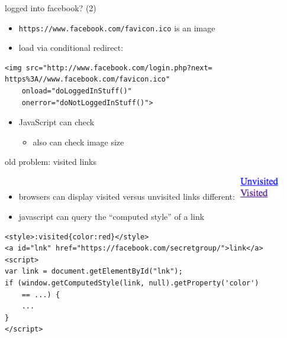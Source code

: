 \begin{frame}[fragile,label=inFB2]{logged into facebook? (2)}
    \begin{itemize}
        \item \texttt{https://www.facebook.com/favicon.ico} is an image
        \item load via conditional redirect:
    \end{itemize}
    \begin{verbatim}
<img src="http://www.facebook.com/login.php?next= https%3A//www.facebook.com/favicon.ico"
    onload="doLoggedInStuff()"
    onerror="doNotLoggedInStuff()">
\end{verbatim}
    \begin{itemize}
        \item JavaScript can check 
            \begin{itemize}
            \item also can check image size
            \end{itemize}
    \end{itemize}
\end{frame}


\begin{frame}[fragile,label=visitedLinks]{old problem: visited links}
    \begin{itemize}
    \item browsers can display visited versus unvisited links different:
        \includegraphics[width=2cm]{../web/visitedunvisited}
    \item javascript can query the ``computed style'' of a link
    \end{itemize}
\begin{verbatim}
<style>:visited{color:red}</style>
<a id="lnk" href="https://facebook.com/secretgroup/">link</a>
<script>
var link = document.getElementById("lnk");
if (window.getComputedStyle(link, null).getProperty('color')
    == ...) {
    ...
}
</script>
\end{verbatim}
\end{frame}

